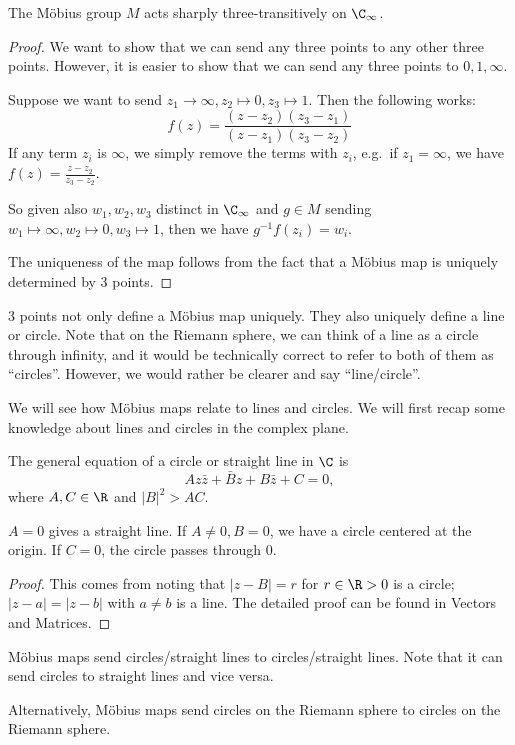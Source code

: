 \documentclass[a4paper]{article}
\begin{document}
\begin{prop}
  The M\"obius group $M$ acts sharply three-transitively on $\C_\infty$.
\end{prop}

\begin{proof}
  We want to show that we can send any three points to any other three points. However, it is easier to show that we can send any three points to $0, 1, \infty$.

  Suppose we want to send $z_1\to \infty, z_2\mapsto 0, z_3 \mapsto 1$. Then the following works:
  \[
    f(z) = \frac{(z - z_2)(z_3 - z_1)}{(z - z_1)(z_3 - z_2)}
  \]
  If any term $z_i$ is $\infty$, we simply remove the terms with $z_i$, e.g.\ if $z_1 = \infty$, we have $f(z) = \frac{z - z_2}{z_3 - z_2}$.

  So given also $w_1, w_2, w_3$ distinct in $\C_\infty$ and $g\in M$ sending $w_1\mapsto \infty, w_2\mapsto 0, w_3\mapsto 1$, then we have $g^{-1}f(z_i) = w_i$.

  The uniqueness of the map follows from the fact that a M\"obius map is uniquely determined by 3 points.
\end{proof}

3 points not only define a M\"obius map uniquely. They also uniquely define a line or circle. Note that on the Riemann sphere, we can think of a line as a circle through infinity, and it would be technically correct to refer to both of them as ``circles''. However, we would rather be clearer and say ``line/circle''.

We will see how M\"obius maps relate to lines and circles. We will first recap some knowledge about lines and circles in the complex plane.

\begin{lemma}
  The general equation of a circle or straight line in $\C$ is
  \[
    Az\bar z + \bar Bz + B\bar z + C = 0,
  \]
  where $A, C\in \R$ and $|B|^2 > AC$.
\end{lemma}
$A = 0$ gives a straight line. If $A \not= 0, B = 0$, we have a circle centered at the origin. If $C = 0$, the circle passes through 0.

\begin{proof}
  This comes from noting that $|z - B| = r$ for $r \in \R> 0$ is a circle; $|z - a| = |z - b|$ with $a\not= b $ is a line. The detailed proof can be found in Vectors and Matrices.
\end{proof}

\begin{prop}
  M\"obius maps send circles/straight lines to circles/straight lines. Note that it can send circles to straight lines and vice versa.

  Alternatively, M\"obius maps send circles on the Riemann sphere to circles on the Riemann sphere.
\end{prop}
\end{document}
